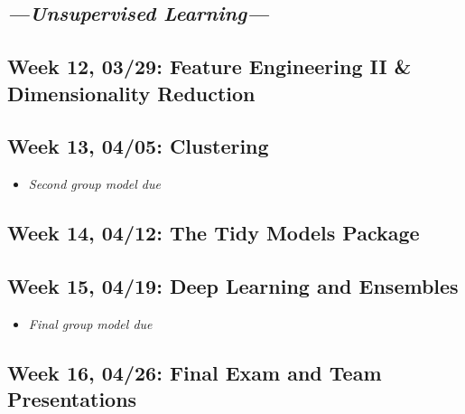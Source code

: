 \documentclass[11pt,]{article}
\providecommand{\tightlist}{%
  \setlength{\itemsep}{0pt}\setlength{\parskip}{0pt}}
\begin{document}
\hypertarget{section-1}{%
\subsection{\texorpdfstring{\emph{\textcolor{OliveGreen}{---Unsupervised Learning---}}}{}}\label{section-1}}

\hypertarget{week-12-0329-feature-engineering-ii-dimensionality-reduction}{%
\subsection{Week 12, 03/29: Feature Engineering II \& Dimensionality
Reduction}\label{week-12-0329-feature-engineering-ii-dimensionality-reduction}}

\hypertarget{week-13-0405-clustering}{%
\subsection{Week 13, 04/05: Clustering}\label{week-13-0405-clustering}}

\begin{itemize}
\tightlist
\item
  \emph{\textcolor{Bittersweet}{Second group model due}}
\end{itemize}

\hypertarget{week-14-0412-the-tidy-models-package}{%
\subsection{Week 14, 04/12: The Tidy Models
Package}\label{week-14-0412-the-tidy-models-package}}

\hypertarget{week-15-0419-deep-learning-and-ensembles}{%
\subsection{Week 15, 04/19: Deep Learning and
Ensembles}\label{week-15-0419-deep-learning-and-ensembles}}

\begin{itemize}
\tightlist
\item
  \emph{\textcolor{Bittersweet}{Final group model due}}
\end{itemize}

\hypertarget{week-16-0426-final-exam-and-team-presentations}{%
\subsection{Week 16, 04/26: Final Exam and Team
Presentations}\label{week-16-0426-final-exam-and-team-presentations}}
\end{document}
